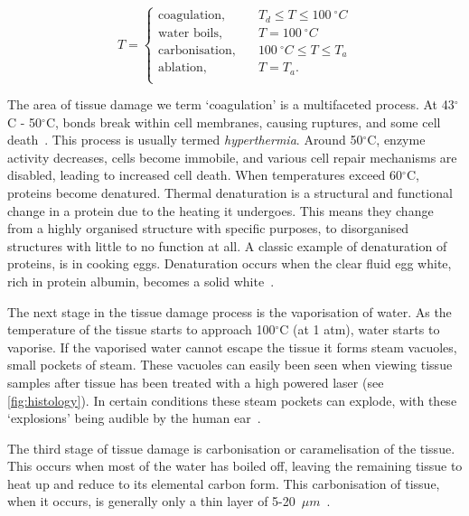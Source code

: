\begin{equation}
T = 
     \begin{cases}
       \text{coagulation,} &\quad T_d\leq T \leq 100~^{\circ}C\\
       \text{water boils,} &\quad T=100~^{\circ}C\\
       \text{carbonisation,} &\quad 100~^{\circ}C \leq T \leq T_a\\
       \text{ablation,} &\quad T=T_a.\\
     \end{cases}
\end{equation}


The area of tissue damage we term `coagulation' is a multifaceted process. At 43$^{\circ}$C - 50$^{\circ}$C, bonds break within cell membranes, causing ruptures, and some cell death~\cite{welch2011optical,wright2015quantitative}. This process is usually termed \textit{hyperthermia}. Around 50$^{\circ}$C, enzyme activity decreases, cells become immobile, and various cell repair mechanisms are disabled, leading to increased cell death. When temperatures exceed 60$^{\circ}$C, proteins become denatured. Thermal denaturation is a structural and functional change in a protein due to the heating it undergoes. This means they change from a highly organised structure with specific purposes, to disorganised structures with little to no function at all.  A classic example of denaturation of proteins, is in cooking eggs. Denaturation occurs when the clear fluid egg white, rich in protein albumin, becomes a solid white~\cite{niemz2013laser}.

The next stage in the tissue damage process is the vaporisation of water. As the temperature of the tissue starts to approach 100${^{\circ}}$C (at 1 atm), water starts to vaporise. If the vaporised water cannot escape the tissue it forms steam vacuoles, small pockets of steam. These vacuoles can easily been seen when viewing tissue samples after tissue has been treated with a high powered laser (see \cref{fig:histology}). In certain conditions these steam pockets can explode, with these `explosions' being audible by the human ear~\cite{petrella2013popcorn}.


The third stage of tissue damage is carbonisation or caramelisation of the tissue. This occurs when most of the water has boiled off, leaving the remaining tissue to heat up and reduce to its elemental carbon form. This carbonisation of tissue, when it occurs, is generally only a thin layer of 5-20~$\mu m$~\cite{welch2011optical,verdaasdonk1990explosive}.

